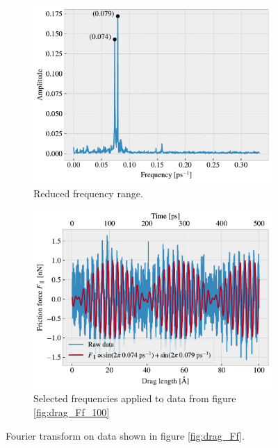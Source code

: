 \begin{figure}[H]
  \centering
  \begin{subfigure}[b]{0.49\textwidth}
    \centering
    \includegraphics[width=\textwidth]{figures/baseline/ft_zoom.pdf}
    \caption{Reduced frequency range.}
    \label{fig:ft_a}
  \end{subfigure}
  \hfill
  \begin{subfigure}[b]{0.49\textwidth}
      \centering
      \includegraphics[width=\textwidth]{figures/baseline/ft_sine.pdf}
      \caption{Selected frequencies applied to data from figure \ref{fig:drag_Ff_100}}
      \label{fig:ft_b}
  \end{subfigure}
  \caption{Fourier transform on data shown in figure \ref{fig:drag_Ff}.}
  \label{fig:ft}
\end{figure}


